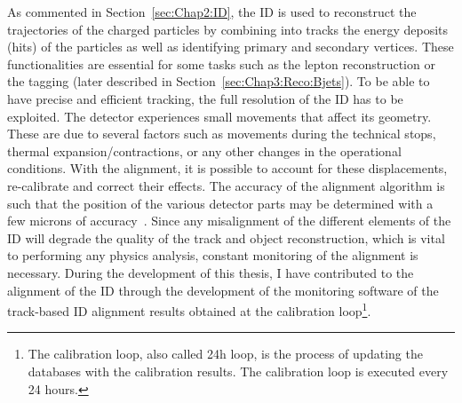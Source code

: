 As commented in Section~\ref{sec:Chap2:ID}, the ID is used to reconstruct the 
trajectories of the charged particles by combining into tracks the energy deposits
(hits) of the particles as well as identifying  primary and secondary vertices. 
These functionalities are essential for some tasks such as the lepton reconstruction
or the \bjet tagging (later described in Section~\ref{sec:Chap3:Reco:Bjets}). 
To be able to have precise and efficient tracking, the full resolution of the ID has to be exploited.
The detector experiences small movements that affect its geometry.
These are due to several factors such as movements during the technical stops, thermal 
expansion/contractions, %
or any other changes in the operational conditions.
With the alignment, it is possible to account for these displacements, re-calibrate and correct their effects. %
The accuracy of the alignment algorithm is such that the position of the various detector parts may be determined
with a few microns of accuracy~\cite{ATLAS:1999vwa}.  
Since any misalignment of the different elements of the ID will degrade the quality of the track and object reconstruction, 
which is vital to performing any physics analysis, constant monitoring of the alignment is necessary.
During the development of this thesis, I have contributed to the alignment of the ID through the
development of the monitoring software of the track-based ID alignment results obtained at the calibration 
loop\footnote{The calibration loop, also called 24h loop, is the process of updating the databases with the calibration results.
The calibration loop is executed every 24 hours.}.


